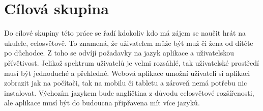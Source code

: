 \section{Cílová skupina}
\label{sc:target_audience}
Do cílové skupiny této práce se řadí kdokoliv kdo má zájem se naučit hrát na ukulele, celosvětově. To znamená, že uživatelem může být muž či žena od dítěte po důchodce. Z toho se odvíjí požadavky na jazyk aplikace a uživatelskou přívětivost. Jelikož spektrum uživatelů je velmi rozsáhlé, tak uživatelské prostředí musí být jednoduché a přehledné. Webová aplikace umožní uživateli si aplikaci zobrazit jak na počítači, tak na mobilu či tabletu a zároveň nemá potřebu nic instalovat. Výchozím jazykem bude angličtina z důvodu celosvětové rozšířenosti, ale aplikace musí být do budoucna připřavena mít více jazyků.
